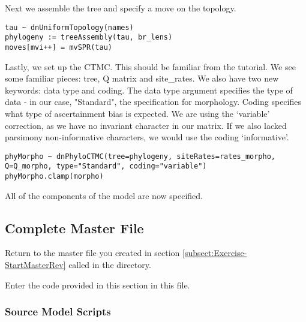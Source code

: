 Next we assemble the tree and specify a move on the topology.

{\tt \begin{snugshade*}
\begin{lstlisting}
tau ~ dnUniformTopology(names)
phylogeny := treeAssembly(tau, br_lens)
moves[mvi++] = mvSPR(tau)
\end{lstlisting}
\end{snugshade*}}

Lastly, we set up the CTMC. 
This should be familiar from the  tutorial.
We see some familiar pieces: tree, Q matrix and site\_rates.
We also have two new keywords: data type and coding.
The data type argument specifies the type of data - in our case, "Standard", the specification for morphology.
Coding specifies what type of ascertainment bias is expected.
We are using the `variable' correction, as we have no invariant character in our matrix.
If we also lacked parsimony non-informative characters, we would use the coding `informative'. 

{\tt \begin{snugshade*}
\begin{lstlisting}
phyMorpho ~ dnPhyloCTMC(tree=phylogeny, siteRates=rates_morpho, Q=Q_morpho, type="Standard", coding="variable")
phyMorpho.clamp(morpho)
\end{lstlisting}
\end{snugshade*}}

All of the components of the model are now specified. \par

\subsection{Complete Master \Rev File}\label{subsect:Exercise-CompleteMCMC}

{\begin{framed}
Return to the master \Rev file you created in section \ref{subsect:Exercise-StartMasterRev} called {\textcolor{red}{}} in the  directory.

Enter the \Rev code provided in this section in this file.
\end{framed}}

\medskip
\subsubsection{Source Model Scripts}\label{subsub:Exercise-SourceMods}

